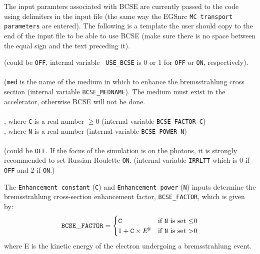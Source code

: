\documentclass[12pt,twoside]{article}
\begin{document}
\noindent The input paramters associated with BCSE  are currently passed
to the code using delimiters in the input file (the same way the EGSnrc
{\tt MC transport parameters} are entered). The following is a template
the user should copy to the end of the input file to be able to use
BCSE (make sure there is no space between the equal sign and the text
preceding it).


 (could be {\tt OFF}, internal variable {\tt
USE\_BCSE} is 0 or 1 for {\tt OFF} or {\tt ON}, respectively).
\\~~\\
 ({\tt med} is the name of
the medium in which to enhance the bremsstrahlung cross
section (internal variable {\tt BCSE\_MEDNAME}).  The medium must exist
in the accelerator, otherwise BCSE will not be done.
\\~~\\
, where {\tt C} is a real number $\ge$0
(internal variable {\tt BCSE\_FACTOR\_C})
\\
, where {\tt N} is a real number
(internal variable {\tt BCSE\_POWER\_N})
\\~~\\
 (could be {\tt OFF}. If the focus of
the simulation
is on the photons, it is strongly recommended to set Russian Roulette
{\tt ON}. (internal variable {\tt IRRLTT} which is 0 if {\tt OFF} and 2 if
{\tt ON}.)


The {\tt Enhancement constant} ({\tt C}) and {\tt Enhancement power} ({\tt N})
inputs determine the bremsstrahlung cross-section enhancement factor, {\tt BCSE\_FACTOR},
which is given by:
\begin{equation}
{\tt BCSE\_FACTOR}=
\begin{cases}
{\tt C} & \text{if {\tt N} is set $\leq$0}\\
1+{\tt C} \times E^{\tt N} & \text{if {\tt N} is set $>$0}\\
\end{cases}
\label{bcse_enhancement_factor_eqn}
\end{equation}
where E is the kinetic energy of the electron undergoing a bremsstrahlung event.
\end{document}
